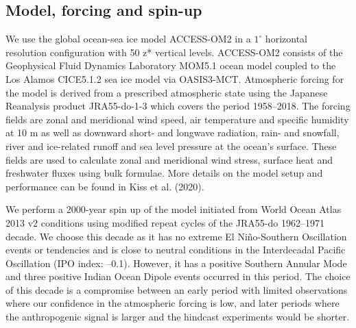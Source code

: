 \documentclass{nature}
\begin{document}
	\begin{methods}
		\section*{Model, forcing and spin-up}
		We use the global ocean-sea ice model ACCESS-OM2\cite{kiss2020access} in a $1^{\circ}$ horizontal resolution configuration with 50 z* vertical levels. ACCESS-OM2 consists of the Geophysical Fluid Dynamics Laboratory MOM5.1 ocean model\cite{griffies2012elements} coupled to the Los Alamos CICE5.1.2 sea ice model\cite{hunke2015cice} via OASIS3-MCT\cite{craig2017oasis-mct}. Atmospheric forcing for the model is derived from a prescribed atmospheric state using the Japanese Reanalysis product JRA55-do-1-3\cite{tsujino2018jra} which covers the period 1958--2018. The forcing fields are zonal and meridional wind speed, air temperature and specific humidity at 10 m as well as downward short- and longwave radiation, rain- and snowfall, river and ice-related runoff and sea level pressure at the ocean's surface. These fields are used to calculate zonal and meridional wind stress, surface heat and freshwater fluxes using bulk formulae\cite{fairall1996bulk}. More details on the model setup and performance can be found in Kiss et al. (2020)\cite{kiss2020access}.
		
		We perform a 2000-year spin up of the model initiated from World Ocean Atlas 2013 v2 conditions\cite{locarnini2013world} using modified repeat cycles of the JRA55-do 1962--1971 decade. We choose this decade as it has no extreme El Ni\~no-Southern Oscillation events or tendencies\cite{huang2015extended} and is close to neutral conditions in the Interdecadal Pacific Oscillation (IPO index: --0.1)\cite{power1999interdecadal}. However, it has a positive Southern Annular Mode and three positive Indian Ocean Dipole events occurred in this period\cite{saji1999IOD}. The choice of this decade is a compromise between an early period with limited observations where our confidence in the atmospheric forcing is low, and later periods where the anthropogenic signal is larger and the hindcast experiments would be shorter.
		

\end{methods}
\end{document}
